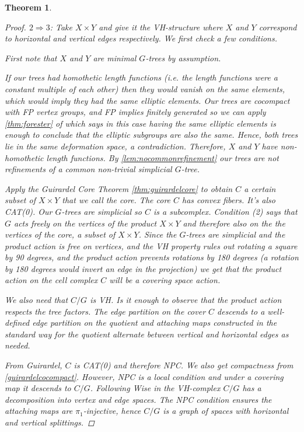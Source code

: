 \documentclass[12pt,parskip=full]{report}
\theoremstyle{plain}
\newtheorem{thm}{Theorem}[section]
\theoremstyle{definition}
\begin{document}
\begin{thm}
\begin{proof}
$2\Rightarrow 3$: Take $X \times Y$ and give it the VH-structure where $X$ and $Y$ correspond to horizontal and vertical edges respectively. We first check a few conditions.
    
    First note that $X$ and $Y$ are minimal $G$-trees by assumption.
    
    If our trees had homothetic length functions (i.e. the length functions were a constant multiple of each other) then they would vanish on the same elements, which would imply they had the same elliptic elements. Our trees are cocompact with FP vertex groups, and FP implies finitely generated so we can apply \ref{thm:forester} of \cite{foresterdeformationrigidity} which says in this case having the same elliptic elements is enough to conclude that the elliptic subgroups are also the same. Hence, both trees lie in the same deformation space, a contradiction. Therefore, \(X\) and \(Y\) have non-homothetic length functions. By \ref{lem:nocommonrefinement} our trees are not refinements of a common non-trivial simplicial $G$-tree.
    
    Apply the Guirardel Core Theorem \ref{thm:guirardelcore} to obtain $C$ a certain subset of $X \times Y$ that we call the core. The core \(C\) has convex fibers. It's also CAT(0). Our \(G\)-trees are simplicial so \(C\) is a subcomplex. Condition (2) says that $G$ acts freely on the vertices of the product $X\times Y$ and therefore also on the the vertices of the core, a subset of $X \times Y$. Since the \(G\)-trees are simplicial and the product action is free on vertices, and the VH property rules out rotating a square by 90 degrees, and the product action prevents rotations by 180 degrees (a rotation by 180 degrees would invert an edge in the projection) we get that the product action on the cell complex \(C\) will be a covering space action.
    
    We also need that $C/G$ is VH. Is it enough to observe that the product action respects the tree factors. The edge partition on the cover \(C\) descends to a well-defined edge partition on the quotient and attaching maps constructed in the standard way for the quotient alternate between vertical and horizontal edges as needed.
    
    From Guirardel, \(C\) is CAT(0) and therefore NPC. We also get compactness from \ref{guirardelcocompact}. However, NPC is a local condition and under a covering map it descends to \(C/G\). Following Wise in \cite{wisethesis} the VH-complex \(C/G\) has a decomposition into vertex and edge spaces. The NPC condition ensures the attaching maps are \(\pi_1\)-injective, hence \(C/G\) is a graph of spaces with horizontal and vertical splittings.
    

\end{proof}
\end{thm}
\end{document}
